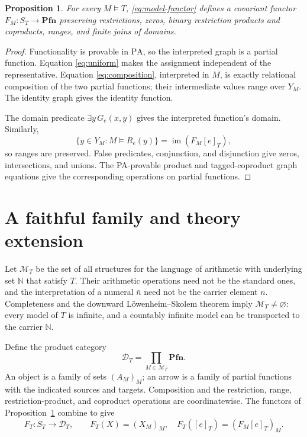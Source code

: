 \documentclass[11pt]{article}
\newtheorem{proposition}[theorem]{Proposition}
\newcommand{\N}{\mathbb N}
\newcommand{\PA}{\mathrm{PA}}
\newcommand{\Pfn}{\mathbf{Pfn}}
\begin{document}
\begin{proposition}\label{prop:model}
For every $M\models T$, \eqref{eq:model-functor} defines a covariant
functor $F_M:S_T\to\Pfn$ preserving restrictions, zeros, binary
restriction products and coproducts, ranges, and finite joins of domains.
\end{proposition}
\begin{proof}
Functionality is provable in $\PA$, so the interpreted graph is a
partial function. Equation \eqref{eq:uniform} makes the assignment
independent of the representative. Equation \eqref{eq:composition},
interpreted in $M$, is exactly relational composition of the two partial
functions; their intermediate values range over $Y_M$. The identity
graph gives the identity function.

The domain predicate $\exists y\,G_e(x,y)$ gives the interpreted
function's domain. Similarly,
\[
 \{y\in Y_M:M\models R_e(y)\}
 =\operatorname{im}(F_M[e]_T),
\]
so ranges are preserved. False predicates, conjunction, and disjunction
give zeros, intersections, and unions. The PA-provable product and
tagged-coproduct graph equations give the corresponding operations on
partial functions.
\end{proof}

\section{A faithful family and theory extension}\label{sec:family}

Let $\mathcal M_T$ be the set of all structures for the language of
arithmetic with underlying set $\N$ that satisfy $T$. Their arithmetic
operations need not be the standard ones, and the interpretation of a
numeral $\bar n$ need not be the carrier element $n$. Completeness and
the downward L\"owenheim--Skolem theorem imply
$\mathcal M_T\ne\varnothing$: every model of $T$ is infinite, and a
countably infinite model can be transported to the carrier $\N$.

Define the product category
\[
 \mathcal D_T=\prod_{M\in\mathcal M_T}\Pfn.
\]
An object is a family of sets $(A_M)_M$; an arrow is a family of partial
functions with the indicated sources and targets. Composition and the
restriction, range, restriction-product, and coproduct operations are coordinatewise.
The functors of Proposition~\ref{prop:model} combine to give
\[
 F_T:S_T\longrightarrow\mathcal D_T,\qquad
 F_T(X)=(X_M)_M,\quad F_T([e]_T)=(F_M[e]_T)_M.
\]
\end{document}
